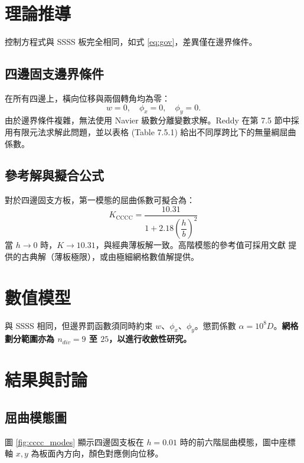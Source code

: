 \section{理論推導}

控制方程式與 SSSS 板完全相同，如式 \eqref{eq:gov}，差異僅在邊界條件。

\subsection{四邊固支邊界條件}
在所有四邊上，橫向位移與兩個轉角均為零：
\[
w = 0,\quad \phi_x = 0,\quad \phi_y = 0.
\]
由於邊界條件複雜，無法使用 Navier 級數分離變數求解。Reddy \cite{reddy2004} 在第 7.5 節中採用有限元法求解此問題，並以表格 (Table 7.5.1) 給出不同厚跨比下的無量綱屈曲係數。

\subsection{參考解與擬合公式}
對於四邊固支方板，第一模態的屈曲係數可擬合為：
\begin{equation}
\boxed{K_{\text{CCCC}} = \frac{10.31}{1 + 2.18\left(\dfrac{h}{b}\right)^2}} \label{eq:K_cccc}
\end{equation}
當 \(h\to 0\) 時，\(K\to 10.31\)，與經典薄板解一致。高階模態的參考值可採用文獻 \cite{leissa1969} 提供的古典解（薄板極限），或由極細網格數值解提供。

\section{數值模型}
與 SSSS 相同，但邊界罰函數須同時約束 \(w\)、\(\phi_x\)、\(\phi_y\)。懲罰係數 \(\alpha = 10^8 D\)。\textbf{網格劃分範圍亦為 \(n_{div} = 9\) 至 \(25\)，以進行收斂性研究。}

\section{結果與討論}
\subsection{屈曲模態圖}
圖 \ref{fig:cccc_modes} 顯示四邊固支板在 \(h=0.01\) 時的前六階屈曲模態，圖中座標軸 \(x, y\) 為板面內方向，顏色對應側向位移。


